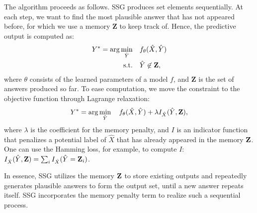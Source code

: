 \documentclass[letterpaper]{article} %
\begin{document}
The algorithm proceeds as follows.
SSG produces set elements sequentially. At each step, we want to find the most plausible answer that has not appeared before, for which we use a memory $\mathbf{Z}$ to keep track of. Hence, the predictive output is computed as:
%
\begin{alignat*}{2}
Y^* = \arg\min_{\hat{Y}} \quad & f_{\theta}(\hat{X},\hat{Y}) \\
  \text{s.t.} \quad &  \begin{aligned}[t]
     \hat{Y} & \not\in {\bf Z},\\
  \end{aligned}
\end{alignat*}
where $\theta$ consists of the learned parameters of a model $f$, and $\mathbf{Z}$ is the set of answers produced so far. To ease computation, we move the constraint to the objective function through Lagrange relaxation:
\begin{equation}
\label{eq:obj}
Y^* = \arg\min_{\hat{Y}}  \quad f_{\theta}(\hat{X},\hat{Y}) + \lambda I_{\hat{X}}(\hat{Y},{\bf Z}),
\end{equation}
where $\lambda$ is the coefficient for the memory penalty, and $I$ is an indicator function that penalizes a potential label of $\hat{X}$ that has already appeared in the memory ${\bf Z}$. One can use the Hamming loss, for example, to compute $I$: $I_{\hat{X}}(\hat{Y},{\bf Z}) = \sum_i I_{\hat{X}}(\hat{Y} = {\bf Z}_i)$.

 In essence, SSG utilizes the memory ${\bf Z}$ to store existing outputs and repeatedly generates plausible answers to form the output set, until a new answer repeats itself. SSG incorporates the memory penalty term to realize such a sequential process.

\end{document}
